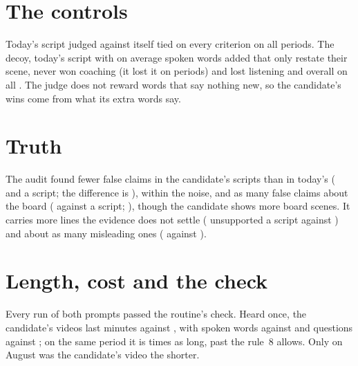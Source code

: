 \documentclass[11pt]{article}
\begin{document}
\section{The controls}

Today's script judged against itself tied on every criterion on all \SameN{} periods. The decoy,
today's script with on average \DecoyAdded{} spoken words added that only restate their scene, never
won coaching (it lost it on \DecoyLostCoaching{} periods) and lost listening and overall on all
\DecoyN. The judge does not reward words that say nothing new, so the candidate's wins come from what
its extra words say.

\section{Truth}

The audit found fewer false claims in the candidate's scripts than in today's (\CandFalse{} and
\BaseFalse{} a script; the difference is \FalseDiff), within the noise, and as many false claims
about the board (\CandBoardFalse{} against \BaseBoardFalse{} a script; \BoardDiff), though the
candidate shows more board scenes. It carries more lines the evidence does not settle
(\CandUnsupported{} unsupported a script against \BaseUnsupported) and about as many misleading ones
(\CandMisleading{} against \BaseMisleading).

\section{Length, cost and the check}

\begin{table}[h]
\centering
\small\LengthTable
\caption{Minutes per video: heard once (spoken words at \WordsPerSecond{} a second plus every pause,
the rule's measure) and rendered (the app's plan voiced by its own voice, the measure the video
grammar's minutes use), and how many rendered videos fall inside the grammar's minutes.}
\label{tab:length}
\end{table}

Every run of both prompts passed the routine's check. Heard once, the candidate's videos last \CandHeard{} minutes against \BaseHeard{}, with
\CandWords{} spoken words against \BaseWords{} and \CandQuestions{} questions against
\BaseQuestions; on the same period it is \LengthRatioInterval{} times as long, past the
\LengthCap{} rule~8 allows. Only on August was the candidate's video the shorter.
\end{document}
